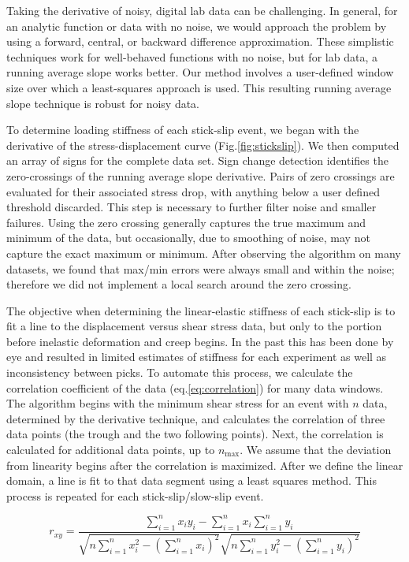 Taking the derivative of noisy, digital lab data can be challenging.  In
general, for an analytic function or data with no noise, we would approach the
problem by using a forward, central, or backward difference approximation.
These simplistic techniques work for well-behaved functions with no noise, but
for lab data, a running average slope works better. Our method involves a
user-defined window size over which a least-squares approach is used.  This
resulting running average slope technique is robust for noisy data.

To determine loading stiffness of each stick-slip event, we began with the
derivative of the stress-displacement curve (Fig.\ref{fig:stickslip}). We then
computed an array of signs for the complete data set. Sign change detection
identifies the zero-crossings of the running average slope derivative.  Pairs of
zero crossings are evaluated for their associated stress drop, with anything
below a user defined threshold discarded.  This step is necessary to further
filter noise and smaller failures.  Using the zero crossing generally captures
the true maximum and minimum of the data, but occasionally, due to smoothing of
noise, may not capture the exact maximum or minimum.  After observing the
algorithm on many datasets, we found that max/min errors were always small and
within the noise; therefore we did not implement a local search around the zero
crossing.

The objective when determining the linear-elastic stiffness of each stick-slip
is to fit a line to the displacement versus shear stress data, but only to the
portion before inelastic deformation and creep begins.  In the past this has
been done by eye and resulted in limited estimates of stiffness for each
experiment as well as inconsistency between picks.  To automate this process, we
calculate the correlation coefficient of the data (eq.\ref{eq:correlation}) for
many data windows.  The algorithm begins with the minimum shear stress for an
event with $n$ data, determined by the derivative technique, and calculates the
correlation of three data points (the trough and the two following points).
Next, the correlation is calculated for additional data points, up to
$n_\text{max}$.  We assume that the deviation from linearity begins after the
correlation is maximized.  After we define the linear domain, a line is fit to
that data segment using a least squares method.  This process is repeated for
each stick-slip/slow-slip event.

\begin{equation}
	r_{xy}= \frac{\displaystyle\sum\limits_{i=1}^n x_i y_i - \displaystyle\sum\limits_{i=1}^n x_i \displaystyle\sum\limits_{i=1}^n y_i}{\sqrt{n \displaystyle\sum\limits_{i=1}^n x_i^2 - \left(\displaystyle\sum\limits_{i=1}^n x_i\right)^2} \sqrt{n \displaystyle\sum\limits_{i=1}^n y_i^2 - \left(\displaystyle\sum\limits_{i=1}^n y_i \right)^2}}
	\label{eq:correlation}
\end{equation}




